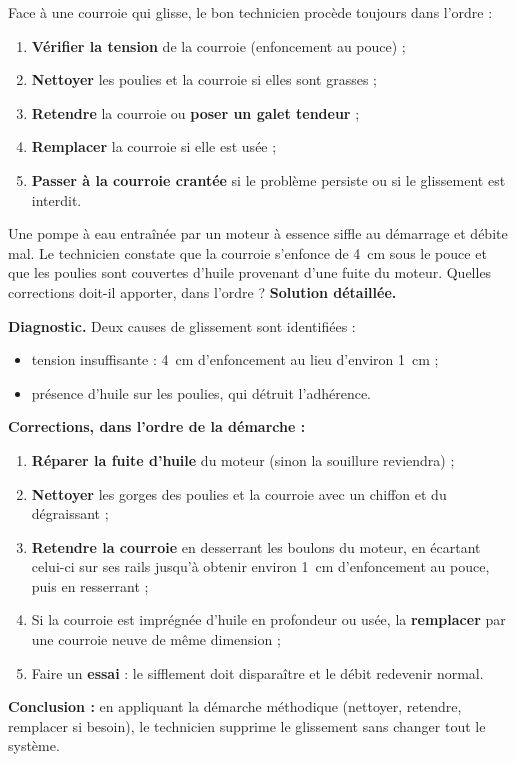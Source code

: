 \documentclass[11pt]{article}
\begin{document}
\begin{methode}
Face à une courroie qui glisse, le bon technicien procède toujours dans l'ordre :
\begin{enumerate}
\item \textbf{Vérifier la tension} de la courroie (enfoncement au pouce) ;
\item \textbf{Nettoyer} les poulies et la courroie si elles sont grasses ;
\item \textbf{Retendre} la courroie ou \textbf{poser un galet tendeur} ;
\item \textbf{Remplacer} la courroie si elle est usée ;
\item \textbf{Passer à la courroie crantée} si le problème persiste ou si le glissement est interdit.
\end{enumerate}
\end{methode}

\begin{exoresolu}
Une pompe à eau entraînée par un moteur à essence siffle au démarrage et débite mal. Le technicien constate que la courroie s'enfonce de \SI{4}{cm} sous le pouce et que les poulies sont couvertes d'huile provenant d'une fuite du moteur. Quelles corrections doit-il apporter, dans l'ordre ?
\tcblower
\textbf{Solution détaillée.}

\textbf{Diagnostic.} Deux causes de glissement sont identifiées :
\begin{itemize}
\item tension insuffisante : \SI{4}{cm} d'enfoncement au lieu d'environ \SI{1}{cm} ;
\item présence d'huile sur les poulies, qui détruit l'adhérence.
\end{itemize}

\textbf{Corrections, dans l'ordre de la démarche :}
\begin{enumerate}
\item \textbf{Réparer la fuite d'huile} du moteur (sinon la souillure reviendra) ;
\item \textbf{Nettoyer} les gorges des poulies et la courroie avec un chiffon et du dégraissant ;
\item \textbf{Retendre la courroie} en desserrant les boulons du moteur, en écartant celui-ci sur ses rails jusqu'à obtenir environ \SI{1}{cm} d'enfoncement au pouce, puis en resserrant ;
\item Si la courroie est imprégnée d'huile en profondeur ou usée, la \textbf{remplacer} par une courroie neuve de même dimension ;
\item Faire un \textbf{essai} : le sifflement doit disparaître et le débit redevenir normal.
\end{enumerate}

\textbf{Conclusion :} en appliquant la démarche méthodique (nettoyer, retendre, remplacer si besoin), le technicien supprime le glissement sans changer tout le système.
\end{exoresolu}
\end{document}

